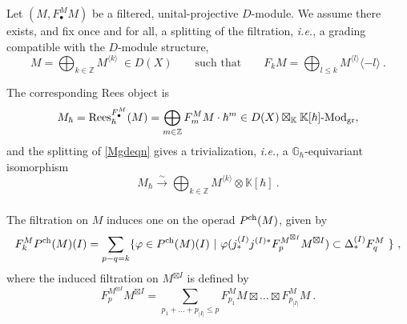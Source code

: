 \documentclass[11pt]{amsart}
\numberwithin{equation}{section}
\theoremstyle{definition}
\newcommand{\bb}{\mathbb}
\newcommand{\Rees}{{\textup{Rees}}}
\newcommand{\Mod}{{\textup{-Mod}}}
\newcommand{\ik}{{\bb K}}
\newcommand{\ch}{{\textup{ch}}}
\newcommand{\0}{{\textbf{0}}}
\newcommand{\DD}{{D}}
\newcommand{\gr}{\textup{gr}}
\newcommand{\Z}{\bb Z}
\def\IZ{\mathbb{Z}}
\def\IG{\mathbb{G}}
\def\ch{{\rm ch}}
\def \ie{{\it i.e.}}
\begin{document}
Let $(M,F^M_\bullet M)$ be a filtered, unital-projective $D$-module. We assume there exists, and fix once and for all, a splitting of the filtration, \ie, a grading compatible with the $D$-module structure,
\begin{equation}\label{Mgdeqn}
	 M=  \bigoplus_{k\in \Z} M^{\langle k \rangle}\ \in \DD(X) \qquad \text{such that} \qquad F_kM =\bigoplus_{l\leq k} M^{\langle l \rangle}\langle -l \rangle   \ . 
\end{equation}

The corresponding Rees object is
\[
M_\hbar = \Rees_\hbar^{F^M_\bullet}(M) = \bigoplus_{m\in\IZ} F^M_m M\cdot \hbar^m\in D(X)\boxtimes_\ik \ik[\hbar]\Mod_\gr,
\]
and the splitting of \eqref{Mgdeqn} gives a trivialization, \ie, a $\IG_\hbar$-equivariant isomorphism
\begin{equation}\label{Vhtrivgreqn}
M_\hbar \xrightarrow{\sim} \bigoplus_{k\in \IZ} M^{\langle k\rangle}\otimes \ik[\hbar]~.
\end{equation}

\subsubsection{}

The filtration on $M$ induces one on the operad $P^\ch(M)$, given by
\begin{equation}\label{Mfilteqn}
	F_k^M P^\ch(M)(I) = \sum_{p-q=k}  \{ \varphi \in P^\ch(M)(I)  \ | \  \varphi(j^{(I)}_*j^{(I)*}F_p^{M^{\boxtimes I}}M^{\boxtimes I})\subset \Delta^{(I)}_*F_q^M  \ \}~,
\end{equation}
where the induced filtration on $M^{\boxtimes I}$ is defined by
\begin{equation}\label{FMboxeqn}
	F_p^{M^{\boxtimes I}}M^{\boxtimes I} = \sum_{p_1+\dots+p_{|I|}\le p}F^M_{p_1}M\boxtimes \dots \boxtimes F_{p_{|I|}}^MM~.
\end{equation}
\end{document}
